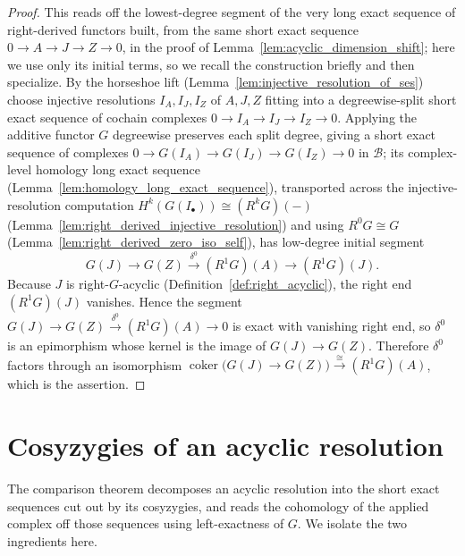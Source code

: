 \begin{proof}
    \leanok
  This reads off the lowest-degree segment of the very long exact sequence of
  right-derived functors built, from the same short exact sequence
  \(0 \to A \to J \to Z \to 0\), in the proof of
  Lemma~\ref{lem:acyclic_dimension_shift}; here we use only its initial terms, so we
  recall the construction briefly and then specialize. By the horseshoe lift
  (Lemma~\ref{lem:injective_resolution_of_ses}) choose injective resolutions
  \(I_A, I_J, I_Z\) of \(A, J, Z\) fitting into a degreewise-split short exact
  sequence of cochain complexes \(0 \to I_A \to I_J \to I_Z \to 0\). Applying the
  additive functor \(G\) degreewise preserves each split degree, giving a short exact
  sequence of complexes \(0 \to G(I_A) \to G(I_J) \to G(I_Z) \to 0\) in
  \(\mathcal{B}\); its complex-level homology long exact sequence
  (Lemma~\ref{lem:homology_long_exact_sequence}), transported across the
  injective-resolution computation \(H^k(G(I_\bullet)) \cong (R^k G)(-)\)
  (Lemma~\ref{lem:right_derived_injective_resolution}) and using
  \(R^0 G \cong G\) (Lemma~\ref{lem:right_derived_zero_iso_self}), has low-degree
  initial segment
  \[
    G(J) \to G(Z) \xrightarrow{\ \delta^0\ } (R^1 G)(A) \to (R^1 G)(J).
  \]
  Because \(J\) is right-\(G\)-acyclic (Definition~\ref{def:right_acyclic}), the right
  end \((R^1 G)(J)\) vanishes. Hence the segment
  \(G(J) \to G(Z) \xrightarrow{\ \delta^0\ } (R^1 G)(A) \to 0\) is exact with vanishing
  right end, so \(\delta^0\) is an epimorphism whose kernel is the image of
  \(G(J) \to G(Z)\). Therefore \(\delta^0\) factors through an isomorphism
  \(\operatorname{coker}\bigl(G(J) \to G(Z)\bigr) \xrightarrow{\ \cong\ } (R^1 G)(A)\),
  which is the assertion.
\end{proof}

\section{Cosyzygies of an acyclic resolution}

The comparison theorem decomposes an acyclic resolution into the short exact
sequences cut out by its cosyzygies, and reads the cohomology of the applied complex
off those sequences using left-exactness of \(G\). We isolate the two ingredients
here.

